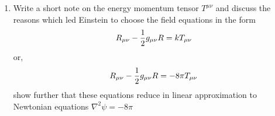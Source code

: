 \documentclass[../main-sheet.tex]{subfiles}
\begin{document}
\begin{enumerate}
\begin{enumerate}
        \item Write a short note on the energy momentum tensor \(T^{\mu\nu}\) and discuss the reasons which led Einstein to choose the field equations in the form
        \[ R_{{\mu\nu}}-\frac{1}{2}g_{\mu\nu} R=kT_{{\mu\nu}}\]
        or,
        \[ R_{{\mu\nu}}-\frac{1}{2}g_{\mu\nu} R=-8\pi T_{{\mu\nu}}\]
        show further that these equations reduce in linear approximation to Newtonian equations \(\nabla^2 \psi=-8\pi\)


\end{enumerate}
\end{enumerate}
\end{document}
